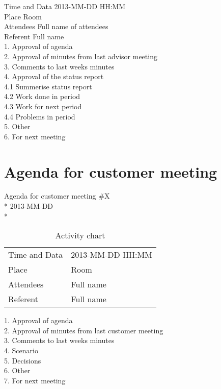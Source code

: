 Time and Data 	2013-MM-DD HH:MM \\
Place 			Room \\
Attendees  		Full name of attendees \\
Referent 		Full name \\

1. Approval of agenda \\
2. Approval of minutes from last advisor meeting \\
3. Comments to last weeks minutes \\
4. Approval of the status report \\
4.1 Summerise status report \\
4.2 Work done in period \\
4.3 Work for next period \\
4.4 Problems in period \\
5. Other \\
6. For next meeting \\
 

\section{Agenda for customer meeting}

\begin{center}
Agenda for customer meeting \#X\\*
2013-MM-DD\\*
\end{center}

\begin{table}[H]
\begin{center}
\begin{tabular}{ l | l }
Time and Data & 2013-MM-DD HH:MM \\
Place & Room \\
Attendees & Full name \\
Referent & Full name \\
\end{tabular}
\end{center}
\caption{Activity chart}
\label{table:activityChartCustomerAgenda}
\end{table}


1. Approval of agenda \\
2. Approval of minutes from last customer meeting \\
3. Comments to last weeks minutes \\
4. Scenario \\
5. Decisions \\
6. Other \\
7. For next meeting \\


